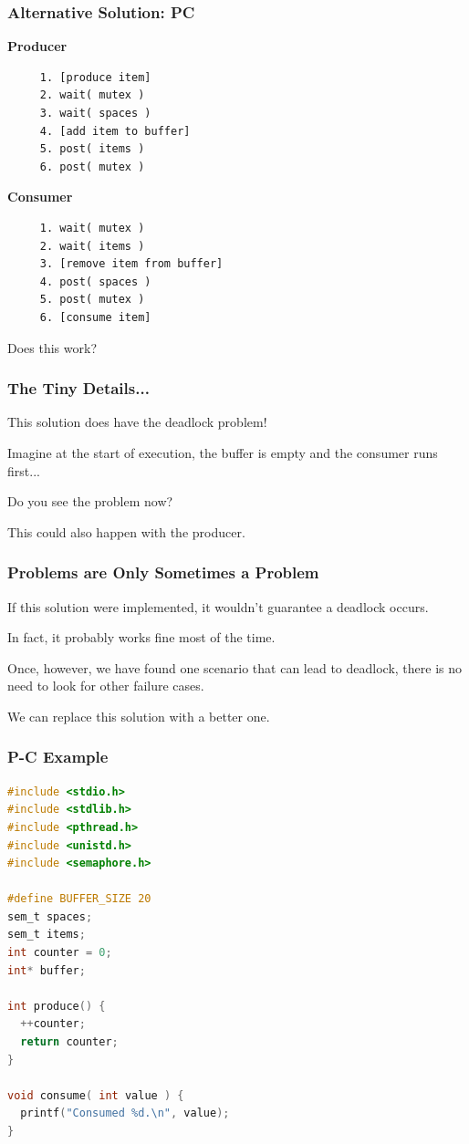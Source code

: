\begin{frame}[fragile]
\frametitle{Alternative Solution: PC}

\begin{multicols}{2}
\textbf{Producer}
  \begin{verbatim}
	 1. [produce item]
	 2. wait( mutex )
	 3. wait( spaces )
	 4. [add item to buffer]
	 5. post( items )
	 6. post( mutex )
  \end{verbatim}
\columnbreak
\textbf{Consumer}
  \begin{verbatim}
	 1. wait( mutex )
	 2. wait( items )
	 3. [remove item from buffer]
	 4. post( spaces )
	 5. post( mutex )
	 6. [consume item]
  \end{verbatim}
\end{multicols}
\vspace{-2em}

Does this work?

\end{frame}

\begin{frame}
\frametitle{The Tiny Details...}

This solution does have the deadlock problem!

Imagine at the start of execution, the buffer is empty and the consumer runs first...

Do you see the problem now?

This could also happen with the producer.

\end{frame}

\begin{frame}
\frametitle{Problems are Only Sometimes a Problem}

If this solution were implemented, it wouldn't guarantee a deadlock occurs.

In fact, it probably works fine most of the time.


Once, however, we have found one scenario that can lead to deadlock, there is no need to look for other failure cases.

We can replace this solution with a better one.

\end{frame}


\begin{frame}[fragile]
\frametitle{P-C Example}

\begin{lstlisting}[language=C]
#include <stdio.h>
#include <stdlib.h>
#include <pthread.h>
#include <unistd.h>
#include <semaphore.h>

#define BUFFER_SIZE 20
sem_t spaces;
sem_t items;
int counter = 0;
int* buffer;

int produce() {
  ++counter;
  return counter;
} 

void consume( int value ) {
  printf("Consumed %d.\n", value);
}
\end{lstlisting}

\end{frame}

